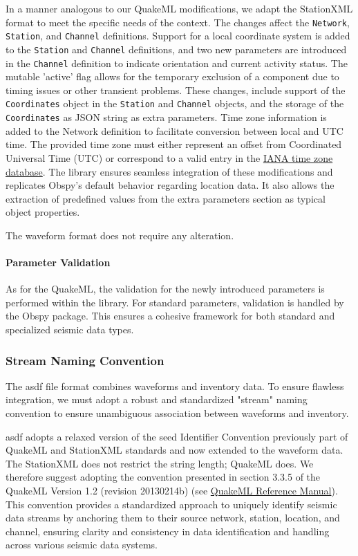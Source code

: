 In a manner analogous to our QuakeML modifications, we adapt the StationXML format to meet the specific needs of the \museismic context. The changes affect the \texttt{Network}, \texttt{Station}, and \texttt{Channel} definitions. Support for a local coordinate system is added to the \texttt{Station} and \texttt{Channel} definitions, and two new parameters are introduced in the \texttt{Channel} definition to indicate orientation and current activity status. The mutable 'active' flag allows for the temporary exclusion of a component due to timing issues or other transient problems. These changes, include support of the \texttt{Coordinates} object in the \texttt{Station} and \texttt{Channel} objects, and the storage of the \texttt{Coordinates} as JSON string as extra parameters. Time zone information is added to the Network definition to facilitate conversion between local and UTC time. The provided time zone must either represent an offset from Coordinated Universal Time (UTC) or correspond to a valid entry in the \href{https://www.iana.org/time-zones}{IANA time zone database}. The \muquake library ensures seamless integration of these modifications and replicates Obspy's default behavior regarding location data. It also allows the extraction of predefined values from the extra parameters section as typical object properties.

The waveform format does not require any alteration.

\paragraph{Parameter Validation}
As for the QuakeML, the validation for the newly introduced parameters is performed within the \muquake library. For standard parameters, validation is handled by the Obspy package. This ensures a cohesive framework for both standard and specialized seismic data types.

\subsubsection{Stream Naming Convention}

The \gls{asdf} file format combines waveforms and inventory data. To ensure flawless integration, we must adopt a robust and standardized "stream" naming convention to ensure unambiguous association between waveforms and inventory. 

\gls{asdf} adopts a relaxed version of the \gls{seed} Identifier Convention previously part of QuakeML and StationXML standards and now extended to the waveform data. The StationXML does not restrict the string length; QuakeML does. We therefore suggest adopting the convention presented in section 3.3.5 of the QuakeML Version 1.2 (revision 20130214b) (see \href{https://quake.ethz.ch/quakeml/docs/latest?action=AttachFile&do=get&target=QuakeML-BED.pdf}{QuakeML Reference Manual}). This convention provides a standardized approach to uniquely identify seismic data streams by anchoring them to their source network, station, location, and channel, ensuring clarity and consistency in data identification and handling across various seismic data systems.

